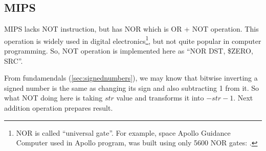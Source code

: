 ﻿\ifx\RUSSIAN\undefined
\subsection{MIPS}



MIPS lacks NOT instruction, but has NOR which is OR + NOT operation.
This operation is widely used in digital electronics\footnote{NOR is called ``universal gate''.
For example, space Apollo Guidance Computer used in Apollo program, 
was built using only 5600 NOR gates: \cite{Eickhoff}.}, but not quite popular in computer programming.
So, NOT operation is implemented here as ``NOR DST, \$ZERO, SRC''.

From fundamendals (\ref{sec:signednumbers}), we may know that bitwise inverting a signed number is the same 
as changing its sign and also subtracting 1 from it.
So what NOT doing here is taking $str$ value and transforms it into $-str-1$.
Next addition operation prepares result.

\fi

